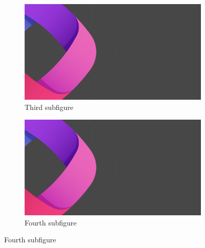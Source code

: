 \documentclass{article}
\begin{document}
\begin{figure}[t!]
\medskip
\begin{subfigure}{0.48\textwidth}
\includegraphics[width=\linewidth]{title.png}
\caption{Third subfigure} \label{fig:c}
\end{subfigure}\hspace*{\fill}
\begin{subfigure}{0.48\textwidth}
\includegraphics[width=\linewidth]{title.png}
\caption{Fourth subfigure} \label{fig:d}
\end{subfigure}


\end{figure}
\end{document}
